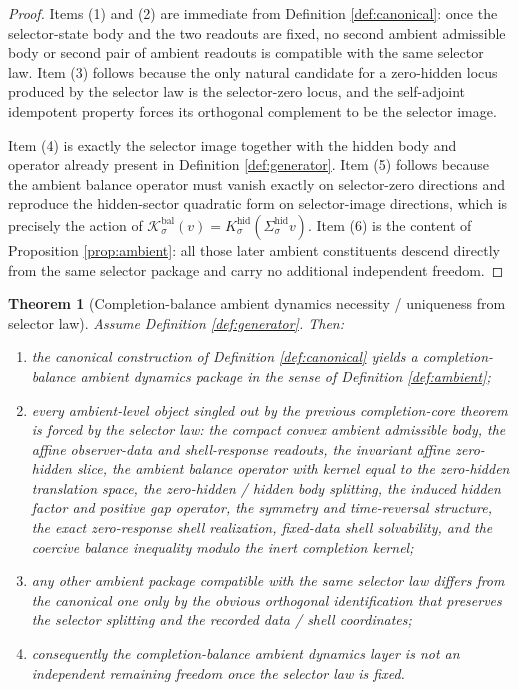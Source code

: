 \documentclass[11pt]{article}
\newcommand{\BalOp}[1]{\mathcal K_{#1}^{\mathrm{bal}}}
\newcommand{\HiddenOperator}[1]{K_{#1}^{\mathrm{hid}}}
\newcommand{\HiddenSel}[1]{\Sigma_{#1}^{\mathrm{hid}}}
\newtheorem{theorem}{Theorem}
\begin{document}
\begin{proof}
Items (1) and (2) are immediate from Definition \ref{def:canonical}: once the selector-state body and the two readouts are fixed, no second ambient admissible body or second pair of ambient readouts is compatible with the same selector law. Item (3) follows because the only natural candidate for a zero-hidden locus produced by the selector law is the selector-zero locus, and the self-adjoint idempotent property forces its orthogonal complement to be the selector image.

Item (4) is exactly the selector image together with the hidden body and operator already present in Definition \ref{def:generator}. Item (5) follows because the ambient balance operator must vanish exactly on selector-zero directions and reproduce the hidden-sector quadratic form on selector-image directions, which is precisely the action of \(\BalOp{\sigma}(v)=\HiddenOperator{\sigma}(\HiddenSel{\sigma}v)\). Item (6) is the content of Proposition \ref{prop:ambient}: all those later ambient constituents descend directly from the same selector package and carry no additional independent freedom.
\end{proof}

\begin{theorem}[Completion-balance ambient dynamics necessity / uniqueness from selector law]
\label{thm:necessity}
Assume Definition \ref{def:generator}. Then:
\begin{enumerate}
    \item the canonical construction of Definition \ref{def:canonical} yields a completion-balance ambient dynamics package in the sense of Definition \ref{def:ambient};
    \item every ambient-level object singled out by the previous completion-core theorem is forced by the selector law: the compact convex ambient admissible body, the affine observer-data and shell-response readouts, the invariant affine zero-hidden slice, the ambient balance operator with kernel equal to the zero-hidden translation space, the zero-hidden / hidden body splitting, the induced hidden factor and positive gap operator, the symmetry and time-reversal structure, the exact zero-response shell realization, fixed-data shell solvability, and the coercive balance inequality modulo the inert completion kernel;
    \item any other ambient package compatible with the same selector law differs from the canonical one only by the obvious orthogonal identification that preserves the selector splitting and the recorded data / shell coordinates;
    \item consequently the completion-balance ambient dynamics layer is not an independent remaining freedom once the selector law is fixed.
\end{enumerate}
\end{theorem}
\end{document}
